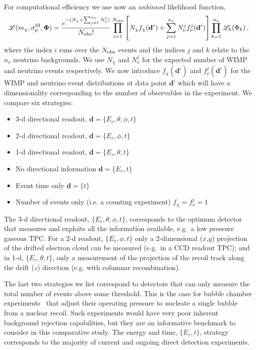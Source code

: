 For computational efficiency we use now an {\it unbinned} likelihood function,
\begin{equation}
\mathscr{L}(m_\chi,\sigma^{\rm SI}_p,\boldsymbol{\Phi}) = \frac{e^{-(N_\chi+\sum_{j=1}^{n_{\nu}}N^j_\nu)}}  {N_{\rm obs}!} \prod_{i=1}^{ N_{\rm obs}}\left[N_\chi f_\chi(\textbf{d}^i) + \sum_{j=1}^{n_{\nu}}N^j_\nu f^j_\nu(\textbf{d}^i)\right] \prod_{k=1}^{n_{\nu}}\mathscr{L}_k(\Phi_k) \,,
\end{equation}
where the index $i$ runs over the $N_{\rm obs}$ events and the indices $j$ and $k$ relate to the $n_\nu$ neutrino backgrounds. We use $N_\chi$ and $N^j_\nu$ for the expected number of WIMP and neutrino events respectively. We now introduce $f_\chi(\textbf{d}^i)$ and $f_\nu^j(\textbf{d}^i)$ for the WIMP and neutrino event distributions at data point $\textbf{d}^i$ which will have a dimensionality corresponding to the number of observables in the experiment. We compare six strategies:
\begin{itemize} \itemsep0em 
 \item 3-d directional readout, $\textbf{d} = \{E_r,\theta,\phi,t\}$
 \item 2-d directional readout, $\textbf{d} = \{E_r,\phi,t\}$
 \item 1-d directional readout, $\textbf{d} = \{E_r,\theta,t\}$
 \item No directional information $\textbf{d} = \{E_r,t\}$
 \item Event time only $\textbf{d} = \{t\}$
 \item Number of events only (i.e. a counting experiment) $f_\chi = f^j_\nu = 1$
\end{itemize}
The 3-d directional readout, $\{E_r,\theta,\phi,t\}$, corresponds to the optimum detector that measures and exploits all the information available, e.g.~a low pressure gaseous TPC. For a 2-d readout, $\{E_r,\phi,t\}$ only a 2-dimensional ($x$,$y$) projection of the drifted electron cloud can be measured (e.g.~in a CCD readout TPC); and in 1-d, $\{E_r,\theta,t\}$, only a measurement of the projection of the recoil track along the drift ($z$) direction (e.g. with columnar recombination).

The last two strategies we list correspond to detectors that can only measure the total number of events above some threshold. This is the case for bubble chamber experiments~\cite{Cushman:2013zza} that adjust their operating pressure to nucleate a single bubble from a nuclear recoil. Such experiments would have very poor inherent background rejection capabilities, but they are an informative benchmark to consider in this comparative study. The energy and time, $\{E_r,t\}$, strategy corresponds to the majority of current and ongoing direct detection experiments.

